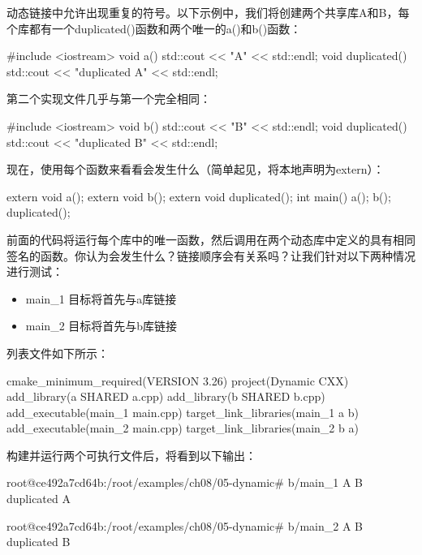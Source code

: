 动态链接中允许出现重复的符号。以下示例中，我们将创建两个共享库A和B，每个库都有一个duplicated()函数和两个唯一的a()和b()函数：


\begin{cpp}
#include <iostream>
void a() {
    std::cout << "A" << std::endl;
}
void duplicated() {
    std::cout << "duplicated A" << std::endl;
}
\end{cpp}

第二个实现文件几乎与第一个完全相同：


\begin{cpp}
#include <iostream>
void b() {
    std::cout << "B" << std::endl;
}
void duplicated() {
    std::cout << "duplicated B" << std::endl;
}
\end{cpp}

现在，使用每个函数来看看会发生什么（简单起见，将本地声明为extern）：


\begin{cpp}
extern void a();
extern void b();
extern void duplicated();
int main() {
    a();
    b();
    duplicated();
}
\end{cpp}

前面的代码将运行每个库中的唯一函数，然后调用在两个动态库中定义的具有相同签名的函数。你认为会发生什么？链接顺序会有关系吗？让我们针对以下两种情况进行测试：

\begin{itemize}
\item
main\_1 目标将首先与a库链接

\item
main\_2 目标将首先与b库链接
\end{itemize}

列表文件如下所示：


\begin{cmake}
cmake_minimum_required(VERSION 3.26)
project(Dynamic CXX)
add_library(a SHARED a.cpp)
add_library(b SHARED b.cpp)
add_executable(main_1 main.cpp)
target_link_libraries(main_1 a b)
add_executable(main_2 main.cpp)
target_link_libraries(main_2 b a)
\end{cmake}

构建并运行两个可执行文件后，将看到以下输出：

\begin{shell}
root@ce492a7cd64b:/root/examples/ch08/05-dynamic# b/main_1
A
B
duplicated A

root@ce492a7cd64b:/root/examples/ch08/05-dynamic# b/main_2
A
B
duplicated B
\end{shell}

